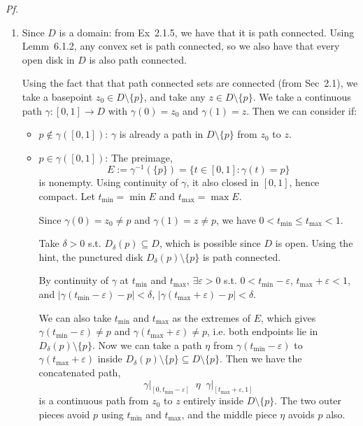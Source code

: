 \documentclass[a4paper]{article}
\begin{document}
\textit{Pf.} \begin{enumerate}
    \item[\textbf{(a)}] Since $D$ is a domain: from Ex~2.1.5, we have that it is path connected. Using Lemm~6.1.2, any convex set is path connected, so we also have that every open disk in $D$ is also path connected. 
    
    Using the fact that that path connected sets are connected (from Sec~2.1), we take a basepoint $z_{0}\in D\setminus\{p\}$, and take any $z\in D\setminus\{p\}$. We take a continuous path $\gamma:[0,1]\to D$ with $\gamma(0)=z_{0}$ and $\gamma(1)=z$. Then we can consider if:
    
    \begin{itemize}
        \item \underline{$p\notin\gamma([0,1])$}: $\gamma$ is already a path in $D\setminus\{p\}$ from $z_0$ to $z$.
        
        \item \underline{$p \in \gamma([0,1])$}: The preimage,
        \[
          E:=\gamma^{-1}(\{p\})=\{t\in[0,1]:\gamma(t)=p\}
        \]
        is nonempty. Using continuity of $\gamma$, it also closed in $[0,1]$, hence compact. Let $t_{\text{min}} = \min E$ and $t_{\text{max}} = \max E$.

        Since $\gamma(0)=z_{0}\ne p$ and $\gamma(1)=z\ne p$, we have $0<t_{\min}\le t_{\max}<1$.
        
        Take $\delta>0$ s.t. $D_{\delta}(p)\subseteq D$, which is possible since $D$ is open. Using the hint, the punctured disk $D_{\delta}(p)\setminus\{p\}$ is path connected.
        
        By continuity of $\gamma$ at $t_{\min}$ and $t_{\max}$, $\exists\varepsilon>0$ s.t. $0<t_{\min}-\varepsilon$, $t_{\max}+\varepsilon<1$, and $|\gamma(t_{\min}-\varepsilon)-p|<\delta$, $|\gamma(t_{\max}+\varepsilon)-p|<\delta$.
        
        We can also take $t_{\min}$ and $t_{\max}$ as the extremes of $E$, which gives $\gamma(t_{\min}-\varepsilon)\ne p$ and $\gamma(t_{\max}+\varepsilon)\ne p$, i.e. both endpoints lie in $D_{\delta}(p)\setminus\{p\}$. Now we can take a path $\eta$ from $\gamma(t_{\min}-\varepsilon)$ to $\gamma(t_{\max}+\varepsilon)$ inside $D_{\delta}(p)\setminus\{p\}\subseteq D\setminus\{p\}$. Then we have the concatenated path,
        \[
          \gamma\big|_{[0,t_{\min}-\varepsilon]} \;\;\eta\;\;\gamma\big|_{[t_{\max}+\varepsilon,1]}
        \]
        is a continuous path from $z_{0}$ to $z$ entirely inside $D\setminus\{p\}$. The two outer pieces avoid $p$ using $t_{\min}$ and $t_{\max}$, and the middle piece $\eta$ avoids $p$ also.
    \end{itemize}
    

\end{enumerate}
\end{document}
